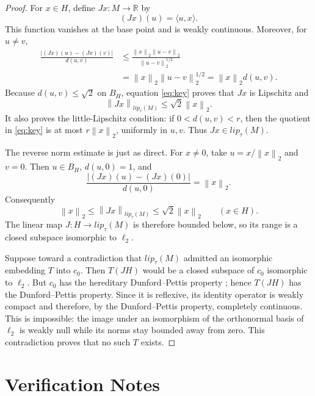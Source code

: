 \documentclass[11pt]{article}
\newcommand{\R}{\mathbb{R}}
\newcommand{\norm}[1]{\left\lVert #1\right\rVert}
\begin{document}
\begin{proof}
For $x\in H$, define $Jx:M\to\R$ by
\[
 (Jx)(u)=\langle u,x\rangle.
\]
This function vanishes at the base point and is weakly continuous. Moreover,
for $u\ne v$,
\begin{equation}\label{eq:key}
\begin{aligned}
 \frac{|(Jx)(u)-(Jx)(v)|}{d(u,v)}
 &\le \frac{\norm{x}_2\norm{u-v}_2}{\norm{u-v}_2^{1/2}}\\
 &=\norm{x}_2\norm{u-v}_2^{1/2}
 =\norm{x}_2d(u,v).
\end{aligned}
\end{equation}
Because $d(u,v)\le\sqrt2$ on $B_H$, equation \eqref{eq:key} proves that
$Jx$ is Lipschitz and
\[
 \norm{Jx}_{lip_\tau(M)}\le\sqrt2\norm{x}_2.
\]
It also proves the little-Lipschitz condition: if $0<d(u,v)<r$, then the
quotient in \eqref{eq:key} is at most $r\norm{x}_2$, uniformly in $u,v$.
Thus $Jx\in lip_\tau(M)$.

The reverse norm estimate is just as direct. For $x\ne0$, take
$u=x/\norm{x}_2$ and $v=0$. Then $u\in B_H$, $d(u,0)=1$, and
\[
 \frac{|(Jx)(u)-(Jx)(0)|}{d(u,0)}=\norm{x}_2.
\]
Consequently
\begin{equation}\label{eq:embedding}
 \norm{x}_2\le\norm{Jx}_{lip_\tau(M)}
 \le\sqrt2\norm{x}_2 \qquad(x\in H).
\end{equation}
The linear map $J:H\to lip_\tau(M)$ is therefore bounded below, so its range
is a closed subspace isomorphic to $\ell_2$.

Suppose toward a contradiction that $lip_\tau(M)$ admitted an isomorphic
embedding $T$ into $c_0$. Then $T(JH)$ would be a closed subspace of $c_0$
isomorphic to $\ell_2$. But $c_0$ has the hereditary Dunford--Pettis property
\cite{Cembranos}; hence $T(JH)$ has the Dunford--Pettis property. Since it is
reflexive, its identity operator is weakly compact and therefore, by the
Dunford--Pettis property, completely continuous. This is impossible: the
image under an isomorphism of the orthonormal basis of $\ell_2$ is weakly
null while its norms stay bounded away from zero. This contradiction proves
that no such $T$ exists.
\end{proof}

\section*{Verification Notes}
\end{document}
